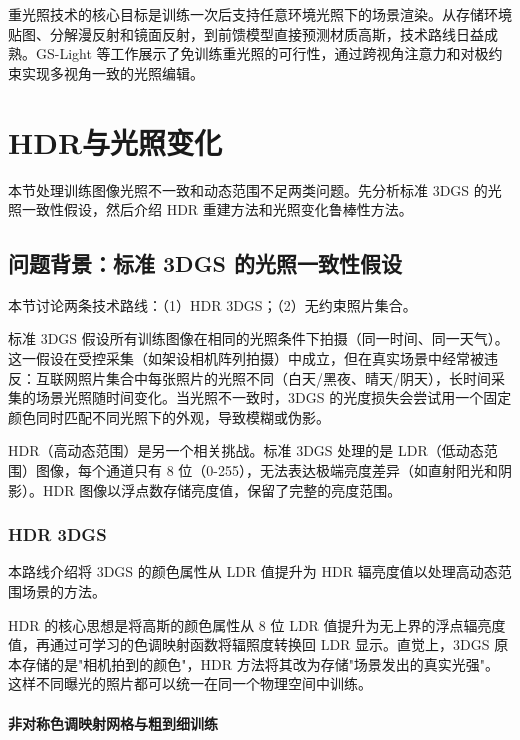 \begin{takeaway}
重光照技术的核心目标是训练一次后支持任意环境光照下的场景渲染。从存储环境贴图、分解漫反射和镜面反射，到前馈模型直接预测材质高斯，技术路线日益成熟。GS-Light 等工作展示了免训练重光照的可行性，通过跨视角注意力和对极约束实现多视角一致的光照编辑。
\end{takeaway}



\section{HDR与光照变化}
\label{sec:05_4}

本节处理训练图像光照不一致和动态范围不足两类问题。先分析标准 3DGS 的光照一致性假设，然后介绍 HDR 重建方法和光照变化鲁棒性方法。

\subsection{问题背景：标准 3DGS 的光照一致性假设}

本节讨论两条技术路线：（1）HDR 3DGS；（2）无约束照片集合。

标准 3DGS 假设所有训练图像在相同的光照条件下拍摄（同一时间、同一天气）。这一假设在受控采集（如架设相机阵列拍摄）中成立，但在真实场景中经常被违反：互联网照片集合中每张照片的光照不同（白天/黑夜、晴天/阴天），长时间采集的场景光照随时间变化。当光照不一致时，3DGS 的光度损失会尝试用一个固定颜色同时匹配不同光照下的外观，导致模糊或伪影。

HDR（高动态范围）是另一个相关挑战。标准 3DGS 处理的是 LDR（低动态范围）图像，每个通道只有 8 位（0-255），无法表达极端亮度差异（如直射阳光和阴影）。HDR 图像以浮点数存储亮度值，保留了完整的亮度范围。

\subsubsection{HDR 3DGS}

本路线介绍将 3DGS 的颜色属性从 LDR 值提升为 HDR 辐亮度值以处理高动态范围场景的方法。

HDR 的核心思想是将高斯的颜色属性从 8 位 LDR 值提升为无上界的浮点辐亮度值，再通过可学习的色调映射函数将辐照度转换回 LDR 显示。直觉上，3DGS 原本存储的是"相机拍到的颜色"，HDR 方法将其改为存储"场景发出的真实光强"。这样不同曝光的照片都可以统一在同一个物理空间中训练。

\paragraph{非对称色调映射网格与粗到细训练}

